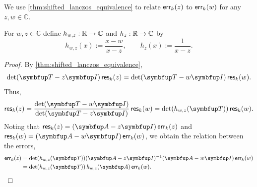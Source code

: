 We use \cref{thm:shifted_lanczos_equivalence} to relate \( \textup{\textsf{err}}_k(z) \) to \( \textup{\textsf{err}}_k(w) \) for any $z,w \in \mathbb{C}$.


\begin{definition}
    \label{def:hwz}
For $w,z\in\mathbb{C}$ define $h_{w,z}:\mathbb{R}\to\mathbb{C}$ and $h_z:\mathbb{R}\to\mathbb{C}$ by
\begin{equation*}
    h_{w,z}(x) := \frac{x-w}{x-z}
    ,\qquad
    h_z(x):= \frac{1}{x-z}.
\end{equation*}
\end{definition}


\begin{proof}
By \cref{thm:shifted_lanczos_equivalence},
\begin{equation*}
    \det(\vec{T} - z\vec{I}) \,\Res_k (z) = \det(\vec{T} - w \vec{I}) \,\Res_k (w). 
\end{equation*}
Thus,
\begin{equation*}
    \Res_k (z) = \frac{\det(\vec{T} - w\vec{I})}{\det(\vec{T} - z\vec{I})} \,\Res_k (w) = \det(h_{w,z}(\vec{T})) \,\Res_k (w) .
\end{equation*}
Noting that \( \Res_k (z) = (\vec{A}-z\vec{I}) \,\err_k(z) \) and 
\( \Res_k (w) = (\vec{A}-w\vec{I}) \,\err_k(w) \), we obtain the relation between the
errors,
\begin{align*}
    \err_k(z)
    &= \det(h_{w,z}(\vec{T})) (\vec{A} - z \vec{I})^{-1} ( \vec{A} - w \vec{I})\, \err_k ( w ) 
    \\&= \det(h_{w,z}(\vec{T}))  \,h_{w,z}(\vec{A}) \,\err_k(w) .
    \tag*{\qedhere}
\end{align*}
\end{proof}

